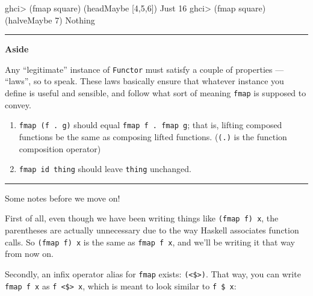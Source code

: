\documentclass[]{article}
\newenvironment{Shaded}{}{}
\newcommand{\DataTypeTok}[1]{\textcolor[rgb]{0.56,0.13,0.00}{{#1}}}
\newcommand{\DecValTok}[1]{\textcolor[rgb]{0.25,0.63,0.44}{{#1}}}
\newcommand{\FunctionTok}[1]{\textcolor[rgb]{0.02,0.16,0.49}{{#1}}}
\newcommand{\NormalTok}[1]{{#1}}
\begin{document}
\begin{Shaded}
\begin{Highlighting}[]
\NormalTok{ghci}\FunctionTok{>} \NormalTok{(fmap square) (headMaybe [}\DecValTok{4}\NormalTok{,}\DecValTok{5}\NormalTok{,}\DecValTok{6}\NormalTok{])}
\DataTypeTok{Just} \DecValTok{16}
\NormalTok{ghci}\FunctionTok{>} \NormalTok{(fmap square) (halveMaybe }\DecValTok{7}\NormalTok{)}
\DataTypeTok{Nothing}
\end{Highlighting}
\end{Shaded}

\begin{center}\rule{0.5\linewidth}{\linethickness}\end{center}

\textbf{Aside}

Any ``legitimate'' instance of \texttt{Functor} must satisfy a couple of properties --- ``laws'', so
to speak. These laws basically ensure that whatever instance you define is useful and sensible, and
follow what sort of meaning \texttt{fmap} is supposed to convey.

\begin{enumerate}
\def\labelenumi{\arabic{enumi}.}
\tightlist
\item
  \texttt{fmap\ (f\ .\ g)} should equal \texttt{fmap\ f\ .\ fmap\ g}; that is, lifting composed
  functions be the same as composing lifted functions. (\texttt{(.)} is the function composition
  operator)
\item
  \texttt{fmap\ id\ thing} should leave \texttt{thing} unchanged.
\end{enumerate}

\begin{center}\rule{0.5\linewidth}{\linethickness}\end{center}

Some notes before we move on!

First of all, even though we have been writing things like \texttt{(fmap\ f)\ x}, the parentheses
are actually unnecessary due to the way Haskell associates function calls. So \texttt{(fmap\ f)\ x}
is the same as \texttt{fmap\ f\ x}, and we'll be writing it that way from now on.

Secondly, an infix operator alias for \texttt{fmap} exists: \texttt{(\textless{}\$\textgreater{})}.
That way, you can write \texttt{fmap\ f\ x} as \texttt{f\ \textless{}\$\textgreater{}\ x}, which is
meant to look similar to \texttt{f\ \$\ x}:

\begin{Shaded}
\end{Shaded}
\end{document}

